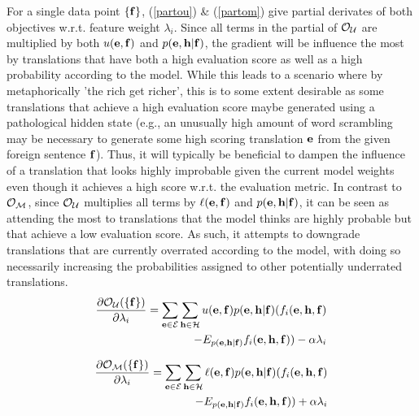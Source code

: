 \documentclass[11pt]{article}
\begin{document}
For a single data point $\{{\bf f}\}$, (\ref{partou}) \& (\ref{partom}) give partial derivates of both objectives w.r.t. feature weight $\lambda_i$. Since all terms in the partial of ${\cal O}_{\cal U}$ are multiplied by both $u({\bf e}, {\bf f})$ and $p({\bf e}, {\bf h} | {\bf f})$, the gradient will be influence the most by translations that have both a high evaluation score as well as a high probability according to the model. While this leads to a scenario where by metaphorically 'the rich get richer', this is to some extent desirable as some translations that achieve a high evaluation score maybe generated using a pathological hidden state (e.g., an unusually high amount of word scrambling may be necessary to generate some high scoring translation ${\bf e}$ from the given foreign sentence ${\bf f}$). Thus, it will typically be beneficial to dampen the influence of a translation that looks highly improbable given the current model weights even though it achieves a high score w.r.t. the evaluation metric. In contrast to ${\cal O}_{\cal M}$, since ${\cal O}_{\cal U}$ multiplies all terms by $\ell({\bf e}, {\bf f})$ and $p({\bf e}, {\bf h} | {\bf f})$, it can be seen as attending the most to translations that the model thinks are highly probable but that achieve a low evaluation score. As such, it attempts to downgrade translations that are currently overrated according to the model, with doing so necessarily increasing the probabilities assigned to other potentially underrated translations. 
\begin{equation}
\begin{split}
\frac {\partial {\cal O}_{\cal U} (\{{\bf f}\})}{\partial \lambda_i} = \sum_{{\bf e} \in {\cal E}}^{} \sum_{{\bf h} \in {\cal H}} u({\bf e}, {\bf f}) p({\bf e},{\bf h} |{\bf f}) ( f_i({\bf e},{\bf h},{\bf f})\\ - E_{p({\bf e},{\bf h}|{\bf f})} f_i({\bf e},{\bf h},{\bf f}) ) - \alpha \lambda_i
\end{split}
\label{partou}
\end{equation}

\begin{equation}
\begin{split}
\frac {\partial {\cal O}_{\cal M} (\{{\bf f}\})}{\partial \lambda_i} = \sum_{{\bf e} \in {\cal E}}^{} \sum_{{\bf h} \in {\cal H}} \ell({\bf e}, {\bf f}) p({\bf e},{\bf h} |{\bf f}) ( f_i({\bf e},{\bf h},{\bf f})\\ - E_{p({\bf e},{\bf h}|{\bf f})} f_i({\bf e},{\bf h},{\bf f}) ) + \alpha \lambda_i
\end{split}
\label{partom}
\end{equation}
\end{document}
